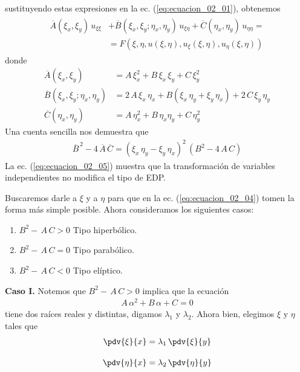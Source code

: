 sustituyendo estas expresiones en la ec. (\ref{eq:ecuacion_02_01}), obtenemos
\begin{align}
\begin{aligned}
\overline{A} (\xi_{x}, \xi_{y}) \, u_{\xi \xi} &+ \overline{B} (\xi_{x}, \xi_{y}; \eta_{x},\eta_{y}) \, u_{\xi \eta} + \overline{C} (\eta_{x}, \eta_{y}) \, u_{\eta \eta} = \\
&= F (\xi, \eta, u(\xi, \eta), u_{\xi}( \xi, \eta), u_{\eta} (\xi, \eta))
\end{aligned}
\label{eq:ecuacion_02_04}    
\end{align}
donde
\begin{align*}
\overline{A} (\xi_{x}, \xi_{y}) &= A \, \xi_{x}^{2} + B \, \xi_{x} \, \xi_{y} + C \, \xi_{y}^{2} \\
\overline{B} (\xi_{x}, \xi_{y}; \eta_{x},\eta_{y}) &= 2 \, A \, \xi_{x} \, \eta_{x} + B (\xi_{x} \, \eta_{y} + \xi_{y} \, \eta_{x}) + 2 \, C \, \xi_{y} \, \eta_{y} \\
\overline{C} (\eta_{x}, \eta_{y}) &= A \, \eta_{x}^{2} + B \, \eta_{x} \eta_{y} + C \, \eta_{y}^{2}
\end{align*}
Una cuenta sencilla nos demuestra que
\begin{align}
\overline{B}^{\, 2} - 4 \, \overline{A} \, \overline{C} = (\xi_{x} \, \eta_{y} - \xi_{y} \, \eta_{x})^{2} \, (B^{2} - 4 \, A \, C)
\label{eq:ecuacion_02_05}    
\end{align}
La ec. (\ref{eq:ecuacion_02_05}) muestra que la transformación de variables independientes no modifica el tipo de EDP.
\par
Buscaremos darle a $\xi$ y a $\eta$ para que en la ec. (\ref{eq:ecuacion_02_04}) tomen la forma más simple posible. Ahora consideramos los siguientes casos:
\begin{enumerate}[label=\textbf{Caso \Roman*.}]
\item $B^{2} -  \, A \, C > 0$ Tipo hiperbólico.
\item $B^{2} -  \, A \, C = 0$ Tipo parabólico.
\item $B^{2} -  \, A \, C < 0$ Tipo elíptico.
\end{enumerate}
\textbf{Caso I. } Notemos que $B^{2} -  \, A \, C > 0$ implica que la ecuación
\begin{align*}
A \, \alpha^{2} + B \, \alpha + C = 0
\end{align*}
tiene dos raíces reales y distintas, digamos $\lambda_{1}$ y $\lambda_{2}$. Ahora bien, elegimos $\xi$ y $\eta$ tales que
\begin{align}
\begin{aligned}
\pdv{\xi}{x} &= \lambda_{1} \, \pdv{\xi}{y} \\[1em]
\pdv{\eta}{x} &= \lambda_{2} \, \pdv{\eta}{y}
\end{aligned}
\label{eq:ecuacion_02_06}    
\end{align}
